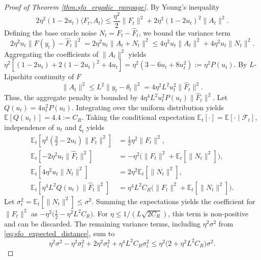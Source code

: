 \documentclass[letter,11pt]{article}
\begin{document}
\begin{proof}[Proof of Theorem \ref{thm:sfo_ergodic_rampage}]
By Young's inequality
\begin{equation}
2\eta^2 (1 - 2u_t) \langle F_t, A_t \rangle \le \frac{\eta^2}{2} \|F_t\|^2 + 2\eta^2 (1 - 2u_t)^2 \|A_t\|^2.
\end{equation}
Defining the base oracle noise $N_t = F_t - \hat{F}_t$, we bound the variance term
\begin{equation}
2\eta^2 u_t \|F(y_t) - \hat{F}_t\|^2 = 2\eta^2 u_t \|A_t + N_t\|^2 \le 4\eta^2 u_t \|A_t\|^2 + 4\eta^2 u_t \|N_t\|^2.
\end{equation}
Aggregating the coefficients of $\|A_t\|^2$ yields $\eta^2 [ (1 - 2u_t) + 2(1 - 2u_t)^2 + 4u_t ] = \eta^2 (3 - 6u_t + 8u_t^2) := \eta^2 P(u_t)$. By $L$-Lipschitz continuity of $F$
\begin{equation}
\|A_t\|^2 \le L^2 \|y_t - \theta_t\|^2 = 4\eta^2 L^2 u_t^2 \|\hat{F}_t\|^2.
\end{equation}
Thus, the aggregate penalty is bounded by $4\eta^4 L^2 u_t^2 P(u_t) \|\hat{F}_t\|^2$. Let $Q(u_t) = 4 u_t^2 P(u_t)$. Integrating over the uniform distribution yields $\mathbb{E}[Q(u_t)] = 4.4 := C_R$. Taking the conditional expectation $\mathbb{E}_t[\cdot] = \mathbb{E}[\cdot \mid \mathcal{F}_t]$, independence of $u_t$ and $\xi_t$ yields
\begin{equation}
\begin{aligned}
\mathbb{E}_t \left[ \eta^2\left( \frac{3}{2} - 2u_t \right) \|F_t\|^2 \right] &= \frac{1}{2}\eta^2 \|F_t\|^2, \\
\mathbb{E}_t \left[ -2\eta^2 u_t \|\hat{F}_t\|^2 \right] &= -\eta^2 \big( \|F_t\|^2 + \mathbb{E}_t[\|N_t\|^2] \big), \\
\mathbb{E}_t \left[ 4\eta^2 u_t \|N_t\|^2 \right] &= 2\eta^2 \mathbb{E}_t[\|N_t\|^2], \\
\mathbb{E}_t \left[ \eta^4 L^2 Q(u_t) \|\hat{F}_t\|^2 \right] &= \eta^4 L^2 C_R \big( \|F_t\|^2 + \mathbb{E}_t[\|N_t\|^2] \big).
\end{aligned}
\end{equation}
Let $\sigma_t^2 = \mathbb{E}_t[\|N_t\|^2] \le \sigma^2$. Summing the expectations yields the coefficient for $\|F_t\|^2$ as $-\eta^2 \big( \frac{1}{2} - \eta^2 L^2 C_R \big)$. For $\eta \le 1 / (L \sqrt{2 C_R})$, this term is non-positive and can be discarded. The remaining variance terms, including $\eta^2 \sigma^2$ from \eqref{eq:sfo_expected_distance}, sum to
\begin{equation}
\eta^2 \sigma^2 - \eta^2 \sigma_t^2 + 2\eta^2 \sigma_t^2 + \eta^4 L^2 C_R \sigma_t^2 \le \eta^2 \big( 2 + \eta^2 L^2 C_R \big) \sigma^2.

\end{equation}
\end{proof}
\end{document}
